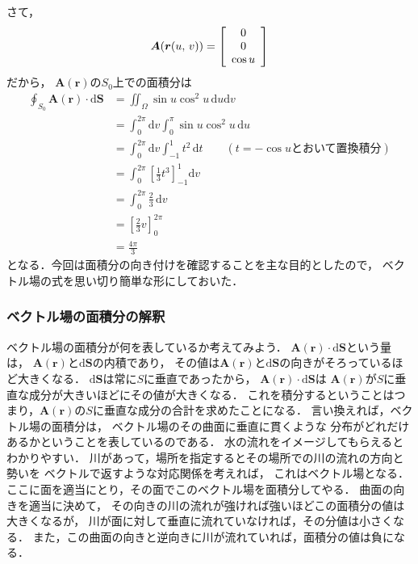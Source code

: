 さて，
\begin{align*}
\bm{A}(\bm{r}(u, \, v) ) = \left[
\renewcommand{\arraystretch}{1}
\begin{array}{c}
0 \\
0 \\
\cos u 
\end{array}
\right]
\end{align*}
だから，
$\bm{A}(\bm{r})$の$S_0$上での面積分は
\begin{align*}
\oint_{S_0} \bm{A}(\bm{r}) \cdot \mathrm{d} \bm{S} 
& = \iint_\Omega \sin u \cos ^2  u \, \mathrm{d} u \mathrm{d} v \\
& = \int_0^{2\pi} \mathrm{d} v \int_0^\pi \sin u \cos ^2 u \, \mathrm{d} u \\
& = \int_0^{2\pi} \mathrm{d}v \int_{-1}^1 t^2 \, \mathrm{d}t \qquad (t = -\cos u \text{とおいて置換積分}) \\
& = \int_0^{2 \pi} \left[ \frac{1}{3} t^3 \right]_{-1}^1 \mathrm{d}v \\
& = \int_0^{2\pi} \frac{2}{3} \, \mathrm{d}v \\
& = \left[ \frac{2}{3} v \right]_0^{2\pi} \\
& = \frac{4\pi}{3} 
\end{align*}
となる．今回は面積分の向き付けを確認することを主な目的としたので，
ベクトル場の式を思い切り簡単な形にしておいた．



\subsubsection{ベクトル場の面積分の解釈}
ベクトル場の面積分が何を表しているか考えてみよう．
$\bm{A}(\bm{r}) \cdot \mathrm{d}\bm{S}$という量は，
$\bm{A}(\bm{r})$と$\mathrm{d}\bm{S}$の内積であり，
その値は$\bm{A}(\bm{r})$と$\mathrm{d}\bm{S}$の向きがそろっているほど大きくなる．
$\mathrm{d}\bm{S}$は常に$S$に垂直であったから，
$\bm{A}(\bm{r}) \cdot \mathrm{d}\bm{S}$は
$\bm{A}(\bm{r})$が$S$に垂直な成分が大きいほどにその値が大きくなる．
これを積分するということはつまり，$\bm{A}(\bm{r})$の$S$に垂直な成分の合計を求めたことになる．
言い換えれば，ベクトル場の面積分は，
ベクトル場のその曲面に垂直に貫くような
分布がどれだけあるかということを表しているのである．
水の流れをイメージしてもらえるとわかりやすい．
川があって，場所を指定するとその場所での川の流れの方向と勢いを
ベクトルで返すような対応関係を考えれば，
これはベクトル場となる．
ここに面を適当にとり，その面でこのベクトル場を面積分してやる．
曲面の向きを適当に決めて，
その向きの川の流れが強ければ強いほどこの面積分の値は大きくなるが，
川が面に対して垂直に流れていなければ，その分値は小さくなる．
また，この曲面の向きと逆向きに川が流れていれば，面積分の値は負になる．


